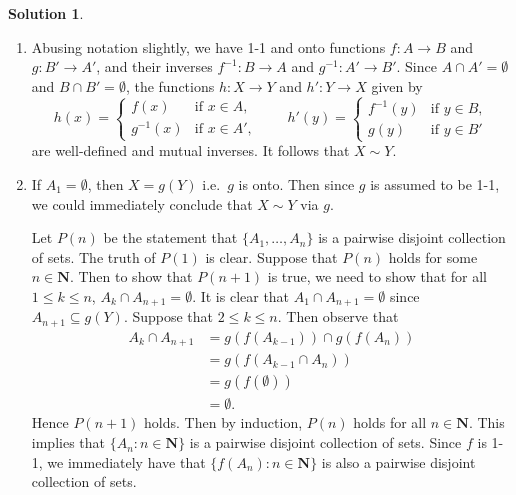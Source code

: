 \documentclass[12pt]{article}
\theoremstyle{definition}
\theoremstyle{exercise}
\theoremstyle{solution}
\newtheorem*{solution}{Solution}
\newcommand{\N}{\mathbf{N}}
\begin{document}
\begin{solution}
    \begin{enumerate}
        \item Abusing notation slightly, we have 1-1 and onto functions \( f : A \to B \) and \( g : B' \to A' \), and their inverses \( f^{-1} : B \to A \) and \( g^{-1} : A' \to B' \). Since \( A \cap A' = \emptyset \) and \( B \cap B' = \emptyset \), the functions \( h : X \to Y \) and \( h' : Y \to X \) given by
        \[
            h(x) = \begin{cases}
                f(x) & \text{if } x \in A, \\
                g^{-1}(x) & \text{if } x \in A',
            \end{cases}
            \qquad
            h'(y) = \begin{cases}
                f^{-1}(y) & \text{if } y \in B, \\
                g(y) & \text{if } y \in B'
            \end{cases}
        \]
        are well-defined and mutual inverses. It follows that \( X \sim Y \).

        \item If \( A_1 = \emptyset \), then \( X = g(Y) \) i.e.\ \( g \) is onto. Then since \( g \) is assumed to be 1-1, we could immediately conclude that \( X \sim Y \) via \( g \).

        Let \( P(n) \) be the statement that \( \{ A_1, \ldots, A_n \} \) is a pairwise disjoint collection of sets. The truth of \( P(1) \) is clear. Suppose that \( P(n) \) holds for some \( n \in \N \). Then to show that \( P(n+1) \) is true, we need to show that for all \( 1 \leq k \leq n \), \( A_k \cap A_{n+1} = \emptyset \). It is clear that \( A_1 \cap A_{n+1} = \emptyset \) since \( A_{n+1} \subseteq g(Y) \). Suppose that \( 2 \leq k \leq n \). Then observe that
        \begin{align*}
            A_k \cap A_{n+1} &= g(f(A_{k-1})) \cap g(f(A_n)) \\
            &= g(f(A_{k-1} \cap A_n)) \tag{\( f \) and \( g \) are 1-1} \\
            &= g(f(\emptyset)) \tag{induction hypothesis} \\
            &= \emptyset.
        \end{align*}
        Hence \( P(n+1) \) holds. Then by induction, \( P(n) \) holds for all \( n \in \N \). This implies that \( \{ A_n : n \in \N \} \) is a pairwise disjoint collection of sets. Since \( f \) is 1-1, we immediately have that \( \{ f(A_n) : n \in \N \} \) is also a pairwise disjoint collection of sets.


\end{enumerate}
\end{solution}
\end{document}
